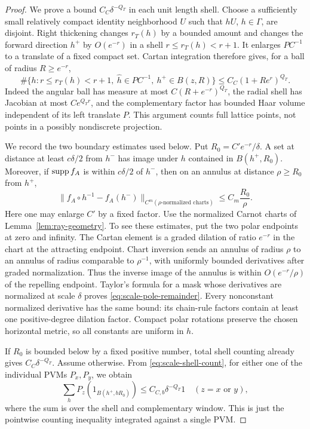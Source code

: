 \begin{proof}
We prove a bound $C_C\delta^{-Q_T}$ in each unit length shell.  Choose
a sufficiently small relatively compact identity neighborhood $U$
such that $hU$, $h\in\Gamma$, are disjoint.  Right thickening changes
$r_T(h)$ by a bounded amount and changes the forward direction $h^+$
by $O(e^{-r})$ in a shell $r\le r_T(h)<r+1$.  It enlarges
$PC^{-1}$ to a translate of a fixed compact set.  Cartan integration
therefore gives, for a ball of radius $R\ge e^{-r}$,
\begin{equation}
 \#\{h:r\le r_T(h)<r+1,\ \hat h\in PC^{-1},\ h^+\in B(z,R)\}
 \le C_C(1+Re^r)^{Q_T}.
 \label{eq:scale-shell-count}
\end{equation}
Indeed the angular ball has measure at most
$C(R+e^{-r})^{Q_T}$, the radial shell has Jacobian at most $Ce^{Q_Tr}$,
and the complementary factor has bounded Haar volume independent of
its left translate $P$.  This argument counts full lattice points,
not points in a possibly nondiscrete projection.

We record the two boundary estimates used below.  Put
$R_0=C'e^{-r}/\delta$.  A set at distance at least $c\delta/2$ from
$h^-$ has image under $h$ contained in $B(h^+,R_0)$.  Moreover, if
$\operatorname{supp} f_A$ is within $c\delta/2$ of $h^-$, then on an annulus at
distance $\rho\ge R_0$ from $h^+$,
\begin{equation}
 \|f_A\circ h^{-1}-f_A(h^-)\|_{C^m(\rho\text{-normalized charts})}
 \le C_m\frac{R_0}{\rho}.
 \label{eq:scale-pole-remainder}
\end{equation}
Here one may enlarge $C'$ by a fixed factor.  Use the normalized
Carnot charts of Lemma~\ref{lem:ray-geometry}.  To see these estimates,
put the two polar endpoints at zero and infinity.  The Cartan element
is a graded dilation of ratio $e^{-r}$ in the chart at the attracting
endpoint.  Chart inversion sends an annulus of radius $\rho$ to an
annulus of radius comparable to $\rho^{-1}$, with uniformly bounded
derivatives after graded normalization.  Thus the inverse image of
the annulus is within $O(e^{-r}/\rho)$ of the repelling endpoint.
Taylor's formula for a mask whose derivatives are normalized at
scale $\delta$ proves \eqref{eq:scale-pole-remainder}.  Every
nonconstant normalized derivative has the same bound: its chain-rule
factors contain at least one positive-degree dilation factor.
Compact polar rotations preserve the chosen horizontal metric, so
all constants are uniform in $h$.

If $R_0$ is bounded below by a fixed positive number, total shell
counting already gives $C_C\delta^{-Q_T}$.  Assume otherwise.  From
\eqref{eq:scale-shell-count}, for either one of the individual PVMs
$P_x,P_y$, we obtain
\begin{equation}
 \sum_h P_z(1_{B(h^+,bR_0)})\le C_{C,b}\delta^{-Q_T}1
 \quad (z=x\text{ or }y),
 \label{eq:scale-pole-projection-sum}
\end{equation}
where the sum is over the shell and complementary window.  This is
just the pointwise counting inequality integrated against a single
PVM.


\end{proof}
